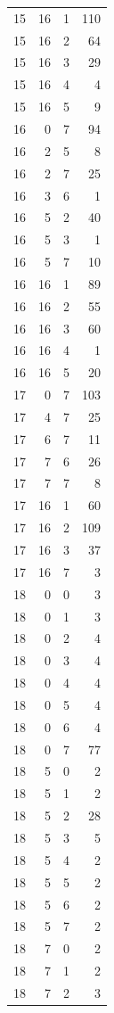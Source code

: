 \begin{longtable}{rrrr}
15 & 16 & 1 & 110\\
15 & 16 & 2 & 64\\
15 & 16 & 3 & 29\\
15 & 16 & 4 & 4\\
15 & 16 & 5 & 9\\
16 & 0 & 7 & 94\\
16 & 2 & 5 & 8\\
16 & 2 & 7 & 25\\
16 & 3 & 6 & 1\\
16 & 5 & 2 & 40\\
16 & 5 & 3 & 1\\
16 & 5 & 7 & 10\\
16 & 16 & 1 & 89\\
16 & 16 & 2 & 55\\
16 & 16 & 3 & 60\\
16 & 16 & 4 & 1\\
16 & 16 & 5 & 20\\
17 & 0 & 7 & 103\\
17 & 4 & 7 & 25\\
17 & 6 & 7 & 11\\
17 & 7 & 6 & 26\\
17 & 7 & 7 & 8\\
17 & 16 & 1 & 60\\
17 & 16 & 2 & 109\\
17 & 16 & 3 & 37\\
17 & 16 & 7 & 3\\
18 & 0 & 0 & 3\\
18 & 0 & 1 & 3\\
18 & 0 & 2 & 4\\
18 & 0 & 3 & 4\\
18 & 0 & 4 & 4\\
18 & 0 & 5 & 4\\
18 & 0 & 6 & 4\\
18 & 0 & 7 & 77\\
18 & 5 & 0 & 2\\
18 & 5 & 1 & 2\\
18 & 5 & 2 & 28\\
18 & 5 & 3 & 5\\
18 & 5 & 4 & 2\\
18 & 5 & 5 & 2\\
18 & 5 & 6 & 2\\
18 & 5 & 7 & 2\\
18 & 7 & 0 & 2\\
18 & 7 & 1 & 2\\
18 & 7 & 2 & 3\\

\end{longtable}
